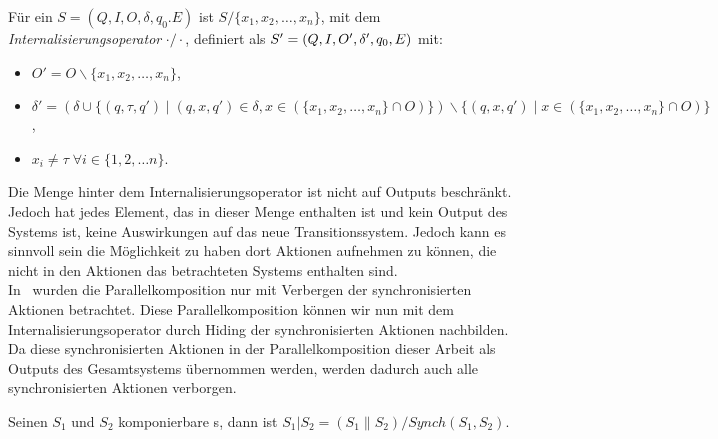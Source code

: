 \begin{Def}[Internalisierungsoperator]
  Für ein \EIO{} $S=(Q,I,O,\delta ,q_0.E)$ ist $S/\{x_1,x_2,\dots ,x_n\}$, mit
  dem \emph{Internalisierungsoperator} $\cdot /\cdot$,
  definiert als $S'=(Q,I,O',\delta ',\linebreak q_0,E)$ mit:
  \begin{itemize}
    \item $O'=O\backslash \{x_1,x_2,\dots ,x_n\}$,
    \item $\delta '=(\delta\cup\{(q,\tau ,q')\mid (q,x,q')\in\delta
      ,x\in(\{x_1,x_2,\dots ,x_n\}\cap O)\})\backslash \{(q,x,q')\mid
      x\in(\{x_1,x_2,\dots ,x_n\}\cap O)\}$,
    \item $x_i\neq\tau\;\forall i\in\{1,2,\dots n\}$.
  \end{itemize}
\end{Def}

Die Menge hinter dem Internalisierungsoperator ist nicht auf Outputs
beschränkt. Jedoch hat jedes Element, das in dieser Menge enthalten ist und
kein Output des Systems ist, keine Auswirkungen auf das neue
Transitionssystem. Jedoch kann es sinnvoll sein die Möglichkeit zu haben dort
Aktionen aufnehmen zu können, die nicht in den Aktionen das betrachteten
Systems enthalten sind.\\
In~\cite{Vogler2014EIO} wurden die Parallelkomposition nur mit Verbergen der
synchronisierten Aktionen betrachtet. Diese Parallelkomposition können wir nun
mit dem Internalisierungsoperator durch Hiding der synchronisierten Aktionen
nachbilden. Da diese synchronisierten Aktionen in der Parallelkomposition dieser
Arbeit als Outputs des Gesamtsystems übernommen werden, werden dadurch auch
alle synchronisierten Aktionen verborgen.

\begin{Def}
  \label{defIntParal}
  Seinen $S_1$ und $S_2$ komponierbare \EIO{}s, dann ist
  $S_1|S_2=(S_1\|S_2)/Synch(S_1,S_2)$.
\end{Def}
